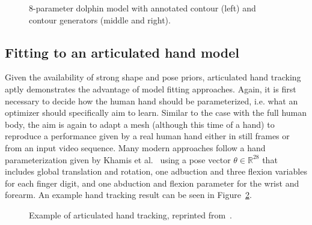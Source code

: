 \begin{figure}[H] %
    \caption{8-parameter dolphin model with annotated contour (left) and contour generators (middle and right).}
    \label{fig:cashman_fitzgibbon}
\end{figure}

\subsection{Fitting to an articulated hand model}
Given the availability of strong shape and pose priors, articulated hand tracking aptly demonstrates the advantage of model fitting approaches. Again, it is first necessary to decide how the human hand should be parameterized, i.e. what an optimizer should specifically aim to learn. Similar to the case with the full human body, the aim is again to adapt a mesh (although this time of a hand) to reproduce a performance given by a real human hand either in still frames or from an input video sequence. Many modern approaches follow a hand parameterization given by Khamis et al.~\cite{Khamis_2015_CVPR} using a pose vector $\theta \in \mathbb{R}^{28}$ that includes global translation and rotation, one adbuction and three flexion variables for each finger digit, and one abduction and flexion parameter for the wrist and forearm. An example hand tracking result can be seen in Figure~\ref{fig:hand_tracking}. 

\begin{figure}[H] %
    \caption{Example of articulated hand tracking, reprinted from~\cite{taylor2016efficient}.}
    \label{fig:hand_tracking}
\end{figure}

